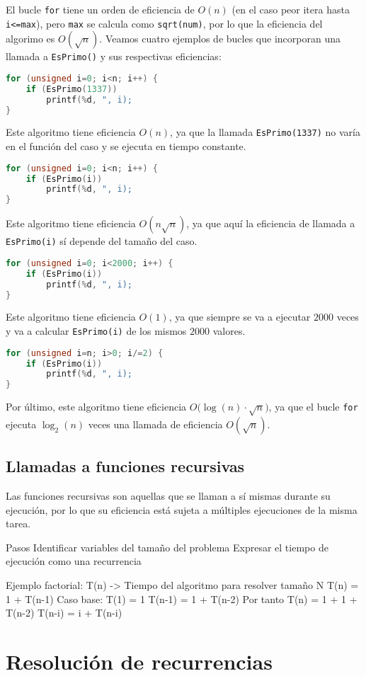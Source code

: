 El bucle \texttt{for} tiene un orden de eficiencia de $O(n)$ (en el caso peor itera hasta \texttt{i<=max}), pero \texttt{max} se calcula como \texttt{sqrt(num)}, por lo que la eficiencia del algorimo es $O(\surd n)$.
Veamos cuatro ejemplos de bucles que incorporan una llamada a \texttt{EsPrimo()} y sus respectivas eficiencias:

\begin{lstlisting}[language=C]
for (unsigned i=0; i<n; i++) {
	if (EsPrimo(1337))
		printf(%d, ", i);
}
\end{lstlisting}

Este algoritmo tiene eficiencia $O(n)$, ya que la llamada \texttt{EsPrimo(1337)} no varía en el función del caso y se ejecuta en tiempo constante.

\begin{lstlisting}[language=C]
for (unsigned i=0; i<n; i++) {
	if (EsPrimo(i))
		printf(%d, ", i);
}
\end{lstlisting}

Este algoritmo tiene eficiencia $O(n\surd n)$, ya que aquí la eficiencia de llamada a \texttt{EsPrimo(i)} sí depende del tamaño del caso.

\begin{lstlisting}[language=C]
for (unsigned i=0; i<2000; i++) {
	if (EsPrimo(i))
		printf(%d, ", i);
}
\end{lstlisting}

Este algoritmo tiene eficiencia $O(1)$, ya que siempre se va a ejecutar $2000$ veces y va a calcular \texttt{EsPrimo(i)} de los mismos $2000$ valores.

\pagebreak

\begin{lstlisting}[language=C]
for (unsigned i=n; i>0; i/=2) {
	if (EsPrimo(i))
		printf(%d, ", i);
}
\end{lstlisting}

Por último, este algoritmo tiene eficiencia $O\big(\log(n)\cdot\surd n\big)$, ya que el bucle \texttt{for} ejecuta $\log_2(n)$ veces una llamada de eficiencia $O(\surd n)$.

\subsection{Llamadas a funciones recursivas}

Las funciones recursivas son aquellas que se llaman a sí mismas durante su ejecución, por lo que su eficiencia está sujeta a múltiples ejecuciones de la misma tarea.

Pasos
	Identificar variables del tamaño del problema
	Expresar el tiempo de ejecución como una recurrencia

Ejemplo factorial:
	T(n) -> Tiempo del algoritmo para resolver tamaño N
	T(n) = 1 + T(n-1)
	Caso base: T(1) = 1
	T(n-1) = 1 + T(n-2)
		Por tanto T(n) = 1 + 1 + T(n-2)
	T(n-i) = i + T(n-i)



\section{Resolución de recurrencias}
